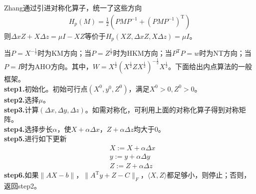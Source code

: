         \par
        Zhang通过引进对称化算子，统一了这些方向
        \begin{align*}
          H_p(M)=\frac 12(PMP^{-1}+(PMP^{-1})^\mathrm{T} )
        \end{align*}
        则$\Delta x Z+X\Delta z=\mu I-XZ$等价于$H_p(XZ,\Delta x Z,X\Delta z)=\mu I$。
        \par
        当$P=X^{-\frac 12}$时为KM方向；当$P=Z^{\frac 12}$时为HKM方向；当$P^\mathrm{T} P=w$时为NT方向；当$P=I$时为AHO方向。其中，$W=X^{\frac 12}(X^{\frac 12}ZX^{\frac 12})^{-\frac 12}X^{\frac 12}$。下面给出内点算法的一般框架。\\
        \textbf{step1.}初始化。初始可行点$(X^0,y^0,Z^0)$，满足$X^0>0,Z^0>0$。 \\
        \textbf{step2.}选择$\mu$。\\
        \textbf{step3.}计算$(\Delta x,\Delta y,\Delta z)$。如需对称化，可利用上面的对称化算子得到对称矩阵。\\
        \textbf{step4.}选择步长${\alpha}$，使$X+\alpha \Delta x，Z+\alpha \Delta z$均大于0。\\
        \textbf{step5.}进行如下更新
        \begin{align*}
        & X:= X+ \alpha \Delta x\\
        & y:= y+ \alpha \Delta y\\
        & Z:= Z+ \alpha \Delta z
        \end{align*}
        \textbf{step6.}如果$\|AX-b\|$，$\|A^\mathrm{T} y+Z-C\|_F$，$\langle{X, Z}\rangle$都足够小，则停止；否则，返回step2。
